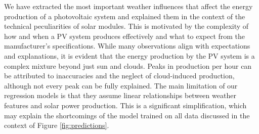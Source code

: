 \documentclass{article}
\begin{document}
We have extracted the most important weather influences that affect the energy production of a photovoltaic system and explained them in the context of the technical peculiarities of solar modules. This is motivated by the complexity of how and when a PV system produces effectively and what to expect from the manufacturer's specifications. While many observations align with expectations and explanations, it is evident that the energy production by the PV system is a complex mixture beyond just sun and clouds. Peaks in production per hour can be attributed to inaccuracies and the neglect of cloud-induced production, although not every peak can be fully explained. The main limitation of our regression models is that they assume linear relationships between weather features and solar power production. This is a significant simplification, which may explain the shortcomings of the model trained on all data discussed in the context of Figure \ref{fig:predictions}.




\end{document}
